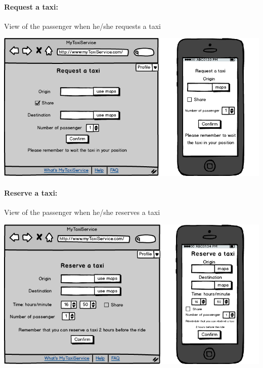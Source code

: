 \paragraph{Request a taxi:}
View of the passenger when he/she requests a taxi
\begin{center}
	\includegraphics[width=\textwidth]{mockup/request.png}
\end{center}
\newpage
\paragraph{Reserve a taxi:}
View of the passenger when he/she reserves a taxi
\begin{center}
	\includegraphics[width=\textwidth]{mockup/reserve.png}
\end{center}

